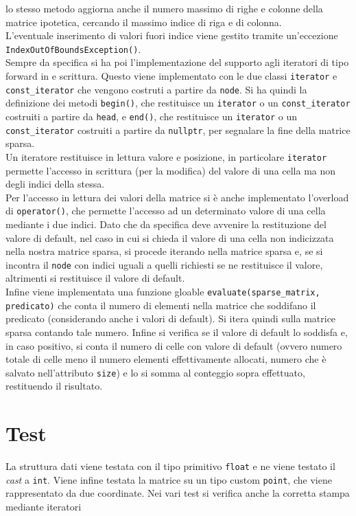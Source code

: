 \documentclass[a4paper,12pt, oneside]{article}
\begin{document}
lo stesso metodo aggiorna anche il numero massimo di righe e colonne
della matrice ipotetica, cercando il massimo indice di riga e di
colonna.
\\
L'eventuale inserimento di valori fuori indice viene gestito tramite
un'eccezione \texttt{IndexOutOfBoundsException()}.\\
Sempre da specifica si ha poi l'implementazione del supporto agli
iteratori di tipo forward in e scrittura. Questo viene implementato
con le due classi \texttt{iterator} e \texttt{const\_iterator} che
vengono costruti a partire da \texttt{node}. Si ha quindi la
definizione dei metodi \texttt{begin()}, che restituisce un
\texttt{iterator} o un \texttt{const\_iterator} costruiti a partire da
\texttt{head}, e \texttt{end()}, che restituisce un
\texttt{iterator} o un \texttt{const\_iterator} costruiti a partire da
\texttt{nullptr}, per segnalare la fine della matrice sparsa. \\
Un iteratore restituisce in lettura valore e posizione, in particolare
\texttt{iterator} permette l'accesso in scrittura (per la modifica)
del valore di una cella ma non degli indici della stessa.\\
Per l'accesso in lettura dei valori della matrice si è anche
implementato l'overload di \texttt{operator()}, che permette l'accesso
ad un determinato valore di una cella mediante i due indici. Dato che
da specifica deve avvenire la restituzione del valore di default, nel
caso in cui si chieda il valore di una cella non indicizzata nella
nostra matrice sparsa, si procede iterando nella matrice sparsa e, se
si incontra il \texttt{node} con indici uguali a quelli richiesti se
ne restituisce il valore, altrimenti si restituisce il valore di
default.\\
Infine viene implementata una funzione gloable
\texttt{evaluate(sparse\_matrix, predicato)} che conta il numero di
elementi nella matrice che soddifano il predicato (considerando anche
i valori di default). Si itera quindi sulla matrice sparsa contando
tale numero. Infine si verifica se il valore di default lo soddisfa e,
in caso positivo, si conta il numero di celle con valore di
default (ovvero numero totale di celle meno il numero elementi
effettivamente allocati, numero che è salvato nell'attributo
\texttt{size}) e lo si somma al conteggio sopra effettuato,
restituendo il risultato.\\
\section*{Test}
La struttura dati viene testata con il tipo primitivo \texttt{float} e
ne viene testato il \textit{cast} a \texttt{int}. Viene infine testata
la matrice su un tipo custom \texttt{point}, che viene rappresentato
da due coordinate. Nei vari test si verifica anche la corretta stampa
mediante iteratori
\end{document}
